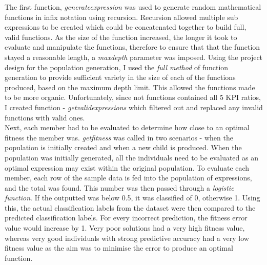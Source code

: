 \documentclass[11pt]{article}
\begin{document}
The first function, \textit{generate\textunderscore expression} was used to generate random mathematical functions in infix notation using recursion. Recursion allowed multiple sub expressions to be created which could be concatenated together to build full, valid functions. 
As the size of the function increased, the longer it took to evaluate and manipulate the functions, therefore to ensure that that the function stayed a reasonable length, a \textit{max\textunderscore depth} parameter was imposed.
Using the project design for the population generation, I used the \textit{full method}\cite{?} of function generation to provide sufficient variety in the size of each of the functions produced, based on the maximum depth limit. This allowed the functions made to be more organic. 
Unfortunately, since not functions contained all 5 KPI ratios, I created function - \textit{get\textunderscore valid\textunderscore expressions} which filtered out and replaced any invalid functions with valid ones. 
 \\ %
Next, each member had to be evaluated to determine how close to an optimal fitness the member was. \textit{get\textunderscore fitness} was called in two scenarios - when the population is initially created and when a new child is produced. When the population was initially generated, all the individuals need to be evaluated as an optimal expression may exist within the original population. To evaluate each member, each row of the sample data is fed into the population of expressions, and the total was found. This number was then passed through a \textit{logistic function}. If  the outputted was below 0.5, it was classified of 0, otherwise 1. Using this, the actual classification labels from the dataset were then compared to the predicted classification labels. For every incorrect prediction, the fitness error value would increase by 1. Very poor solutions had a very high fitness value, whereas very good individuals with strong predictive accuracy had a very low fitness value as the aim was to minimise the error to produce an optimal function.\\
\end{document}
